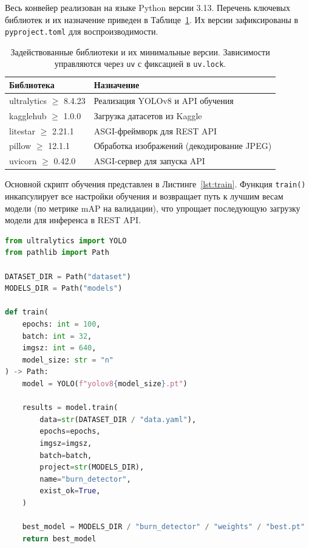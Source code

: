 Весь конвейер реализован на языке Python версии 3.13. Перечень ключевых библиотек и их назначение приведен в Таблице~\ref{tab:libraries}. Их версии зафиксированы в \texttt{pyproject.toml} для воспроизводимости.

\begin{table}[H]
\centering
\caption{Задействованные библиотеки и их минимальные версии. Зависимости управляются через \texttt{uv} с фиксацией в \texttt{uv.lock}.}
\label{tab:libraries}
\begin{tabular}{ll}
\toprule
\textbf{Библиотека} & \textbf{Назначение} \\
\midrule
ultralytics $\geq$ 8.4.23 & Реализация YOLOv8 и API обучения~\cite{ultralytics2023yolov8} \\
kagglehub $\geq$ 1.0.0    & Загрузка датасетов из Kaggle \\
litestar $\geq$ 2.21.1    & ASGI-фреймворк для REST API~\cite{litestar2023} \\
pillow $\geq$ 12.1.1      & Обработка изображений (декодирование JPEG) \\
uvicorn $\geq$ 0.42.0     & ASGI-сервер для запуска API \\
\bottomrule
\end{tabular}
\end{table}

Основной скрипт обучения представлен в Листинге~\ref{lst:train}. Функция \texttt{train()} инкапсулирует все настройки обучения и возвращает путь к лучшим весам модели (по метрике mAP на валидации), что упрощает последующую загрузку модели для инференса в REST API.

\begin{lstlisting}[language=Python, caption=Основной скрипт обучения модели YOLOv8, label=lst:train]
from ultralytics import YOLO
from pathlib import Path

DATASET_DIR = Path("dataset")
MODELS_DIR = Path("models")

def train(
    epochs: int = 100,
    batch: int = 32,
    imgsz: int = 640,
    model_size: str = "n"
) -> Path:
    model = YOLO(f"yolov8{model_size}.pt")

    results = model.train(
        data=str(DATASET_DIR / "data.yaml"),
        epochs=epochs,
        imgsz=imgsz,
        batch=batch,
        project=str(MODELS_DIR),
        name="burn_detector",
        exist_ok=True,
    )

    best_model = MODELS_DIR / "burn_detector" / "weights" / "best.pt"
    return best_model
\end{lstlisting}
